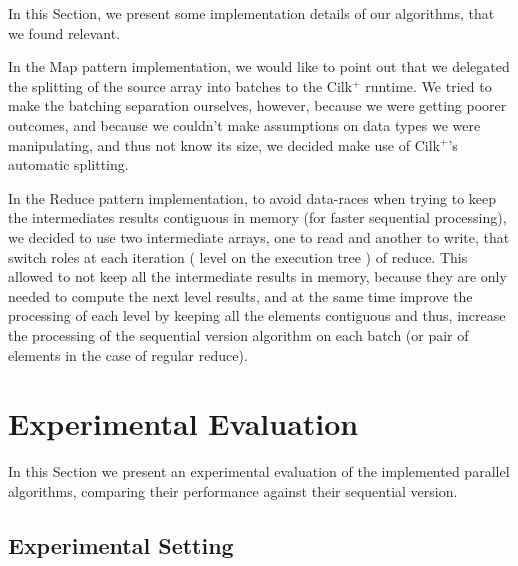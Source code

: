 \documentclass[conference,compsoc]{IEEEtran}
\begin{document}
In this Section, we present some implementation details of our algorithms, that we found relevant.

In the Map pattern implementation, we would like to point out that we delegated the splitting of the source array into batches to the Cilk$^+$ runtime.
We tried to make the batching separation ourselves, however, because we were getting poorer outcomes, and because we couldn't make assumptions on data types we were manipulating, and thus not know its size, we decided make use of Cilk$^+$'s automatic splitting.



In the Reduce pattern implementation, to avoid data-races when trying to keep the intermediates results contiguous in memory (for faster sequential processing), we decided to use two intermediate arrays, one to read and another to write, that switch roles at each iteration ( level on the execution tree ) of reduce. This allowed to not keep all the intermediate results in memory, because they are only needed to compute the next level results, and at the same time improve the processing of each level by keeping all the elements contiguous and thus, increase the processing of the sequential version algorithm on each batch (or pair of elements in the case of regular reduce).



\section{Experimental Evaluation} \label{Experimental_Eval}
In this Section we present an experimental evaluation of the implemented parallel algorithms, comparing their performance against their sequential version.

\subsection{Experimental Setting}
\end{document}
